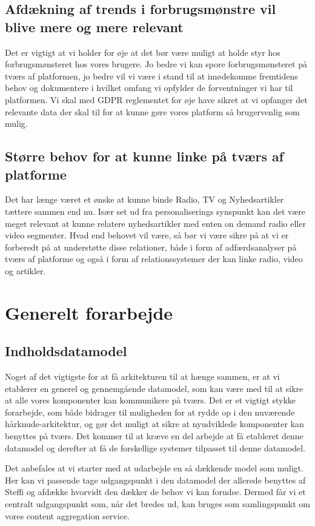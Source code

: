 \documentclass{article}
\begin{document}
\subsection{Afdækning af trends i forbrugsmønstre vil blive mere og mere relevant}
Det er vigtigt at vi holder for øje at det bør være muligt at holde styr hos forbrugsmønsteret hos vores brugere. Jo bedre vi kan spore forbrugsmønsteret på tværs af platformen, jo bedre vil vi være i stand til at imødekomme fremtidens behov og dokumentere i hvilket omfang vi opfylder de forventninger vi har til platformen.
Vi skal med GDPR reglementet for øje have sikret at vi opfanger det relevante data der skal til for at kunne gøre vores platform så brugervenlig som mulig.


\subsection{Større behov for at kunne linke på tværs af platforme}
Det har længe været et ønske at kunne binde Radio, TV og Nyhedsartikler tættere sammen end nu. Især set ud fra personaliserings synspunkt kan det være meget relevant at kunne relatere nyhedsartikler med enten on demand radio eller video segmenter.
Hvad end behovet vil være, så bør vi være sikre på at vi er forberedt på at understøtte disse relationer, både i form af adfærdsanalyser på tværs af platforme og også i form af relationssystemer der kan linke radio, video og artikler.


\section{Generelt forarbejde}
\subsection{Indholdsdatamodel}
Noget af det vigtigste for at få arkitekturen til at hænge sammen, er at vi etablerer en generel og gennemgående datamodel, som kan være med til at sikre at alle vores komponenter kan kommunikere på tværs. Det er et vigtigt stykke forarbejde, som både bidrager til muligheden for at rydde op i den nuværende hårknude-arkitektur, og gør det muligt at sikre at nyudviklede komponenter kan benyttes på tværs. Det kommer til at kræve en del arbejde at få etableret denne datamodel og derefter at få de forskellige systemer tilpasset til denne datamodel.

Det anbefales at vi starter med at udarbejde en så dækkende model som muligt. Her kan vi passende tage udgangspunkt i den datamodel der allerede benyttes af Steffi og afdække hvorvidt den dækker de behov vi kan forudse. Dermed får vi et centralt udgangspunkt som, når det bredes ud, kan bruges som samlingspunkt om vores content aggregation service. 
\end{document}
